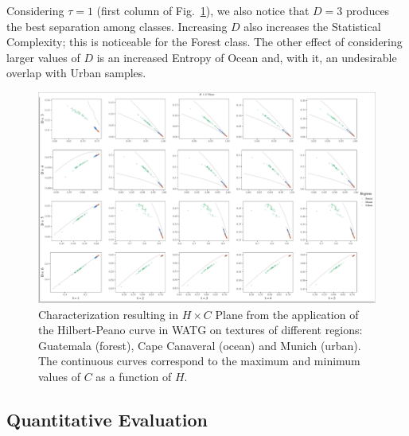 \documentclass[journal]{IEEEtran}
\begin{document}
Considering $\tau=1$ (first column of Fig.~\ref{fig:Regions}), 
we also notice that $D=3$ produces the best separation among classes.
Increasing $D$ also increases the Statistical Complexity; this is noticeable for the Forest class.
The other effect of considering larger values of $D$ is an increased Entropy of Ocean and, with it, an undesirable overlap with Urban samples.


\begin{figure}
	\centering
	\includegraphics[width=1\textwidth]{Figures/WATGHC.pdf}
	\caption{Characterization resulting in $H \times C$ Plane from the application of the Hilbert-Peano curve in WATG on textures of different regions: Guatemala (forest), Cape Canaveral (ocean) and Munich (urban). 
		The continuous curves correspond to the maximum and minimum values of $C$ as a function of $H$.}
	\label{fig:Regions}
\end{figure}

\subsection{Quantitative Evaluation}
\end{document}
